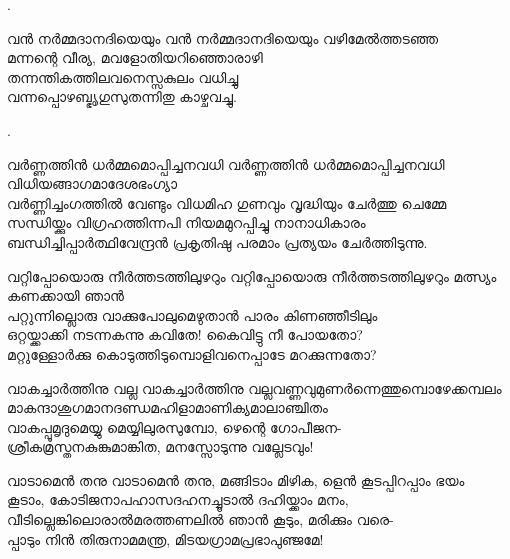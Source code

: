 \begin{enumerate}

.


\begin{slokam}{\VVt}{\Ull}{വൻ നർമ്മദാനദിയെയും}
 വൻ നർമ്മദാനദിയെയും വഴിമേൽത്തടഞ്ഞ\\
മന്നന്റെ വീര്യ, മവളോതിയറിഞ്ഞൊരാഴി\\
തന്നന്തികത്തിലവനെസ്സകുലം വധിച്ചു\\
വന്നപ്പൊഴബ്ഭൃഗുസുതന്നിതു കാഴ്ചവച്ചു.
\end{slokam}


.


\begin{slokam}{\VSr}{\ARRV}{വർണ്ണത്തിൻ ധർമ്മമൊപ്പിച്ചനവധി}
വർണ്ണത്തിൻ ധർമ്മമൊപ്പിച്ചനവധി വിധിയങ്ങാഗമാദേശഭംഗ്യാ\\
വർണ്ണിച്ചംഗത്തിൽ വേണ്ടും വിധമിഹ ഗുണവും വൃദ്ധിയും ചേർത്തു ചെമ്മേ\\
സന്ധിയ്ക്കും വിഗ്രഹത്തിന്നപി നിയമമുറപ്പിച്ചു നാനാധികാരം\\
ബന്ധിച്ചിപ്പാർത്ഥിവേന്ദ്രൻ പ്രകൃതിഷു പരമാം പ്രത്യയം ചേർത്തിടുന്നു.
\end{slokam}



\begin{slokam}{\VSv}{\HM}{വറ്റിപ്പോയൊരു നീർത്തടത്തിലുഴറും}
വറ്റിപ്പോയൊരു നീർത്തടത്തിലുഴറും മത്സ്യം കണക്കായി ഞാൻ \\
പറ്റുന്നില്ലൊരു വാക്കുപോലുമെഴുതാൻ പാരം കിണഞ്ഞീടിലും \\
ഒറ്റയ്ക്കാക്കി നടന്നകന്നു കവിതേ! കൈവിട്ടു നീ പോയതോ? \\
മറ്റുള്ളോർക്കു കൊടുത്തിടുമ്പൊളിവനെപ്പാടേ മറക്കുന്നതോ?
\end{slokam}




\begin{slokam}{\VSv}{\VKG}{വാകച്ചാർത്തിനു വല്ല}
വാകച്ചാർത്തിനു വല്ലവണ്ണവുമുണർന്നെത്തുമ്പൊഴേക്കമ്പലം\\
മാകന്ദാശുഗമാനദണ്ഡമഹിളാമാണിക്യമാലാഞ്ചിതം\\
വാകപ്പൂമൃദുമെയ്യു മെയ്യിലുരസുമ്പോ, ഴെന്റെ ഗോപീജന-\\
ശ്രീകമ്രസ്തനകുങ്കുമാങ്കിത, മനസ്സോടുന്നു വല്ലേടവും!
\end{slokam}


\begin{slokam}{\VSv}{\VKG}{വാടാമെൻ തനു}
വാടാമെൻ തനു, മങ്ങിടാം മിഴിക, ളെൻ കൂടപ്പിറപ്പാം ഭയം\\
കൂടാം, കോടിജനാപഹാസദഹനച്ചൂടാൽ ദഹിയ്ക്കാം മനം,\\
വീടില്ലെങ്കിലൊരാൽമരത്തണലിൽ ഞാൻ കൂടും, മരിക്കും വരെ-\\
പ്പാടും നിൻ തിരുനാമമന്ത്ര, മിടയഗ്രാമപ്രഭാപുഞ്ജമേ!
\end{slokam}


\end{enumerate}
